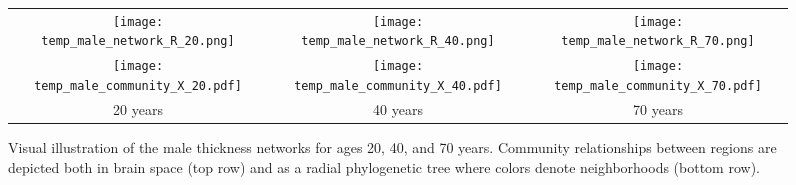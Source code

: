 \begin{figure*}[htb]
  \centering
  \begin{tabular}{ccc}
  \texttt{[image: temp\_male\_network\_R\_20.png]} &
  \texttt{[image: temp\_male\_network\_R\_40.png]} &
  \texttt{[image: temp\_male\_network\_R\_70.png]} \\
  \texttt{[image: temp\_male\_community\_X\_20.pdf]} &
  \texttt{[image: temp\_male\_community\_X\_40.pdf]} &
  \texttt{[image: temp\_male\_community\_X\_70.pdf]} \\
  20 years & 40 years & 70 years 
  \end{tabular}
  \caption{Visual illustration of the male thickness networks for ages 20, 40, 
  and 70 years.  Community relationships between regions are depicted both in 
  brain space (top row) and as a radial phylogenetic tree where colors denote 
  neighborhoods (bottom row).
  }
  \label{fig:maleVisualNetworks}
\end{figure*}



